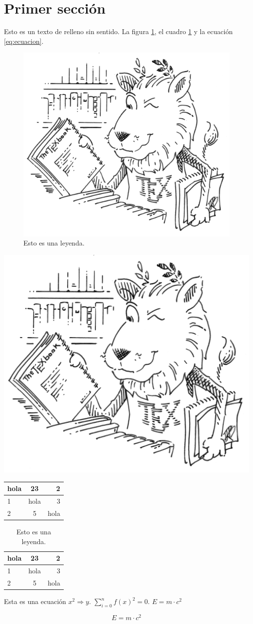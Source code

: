 \documentclass[12pt]{article}
\begin{document}
\section{Primer sección}
Esto es un texto de relleno sin sentido. La figura \ref{fig:leon}, el cuadro \ref{tab:datos} y la ecuación \eqref{eq:ecuacion}.

\begin{figure}[h]
	\centering
	\includegraphics[width=0.4\linewidth]{figuras/leon}
	\caption{Esto es una leyenda.}
	\label{fig:leon}
\end{figure}

\includegraphics[width=0.4\linewidth]{figuras/leon}

	\begin{tabular}{|l|c|r|}
	\hline
	hola & 23 & 2 \\
	\hline
	1 & hola & 3 \\
	\hline
	2 & 5 & hola \\
	\hline
\end{tabular}

\begin{table}[h]
	\centering
	\caption{Esto es una leyenda.}
	\begin{tabular}{|l|c|r|}
		\hline
		hola & 23 & 2 \\
		\hline
		1 & hola & 3 \\
		\hline
		2 & 5 & hola \\
		\hline
	\end{tabular}
	\label{tab:datos}
\end{table}

Esta es una ecuación $x^2 \Rightarrow y$. $\sum _{i=0}^{n}f{\left(x\right)}^{2}=0$. $E = m\cdot c^2$

\begin{equation} \label{eq:ecuacion}
	E = m\cdot c^2
\end{equation}
\end{document}
